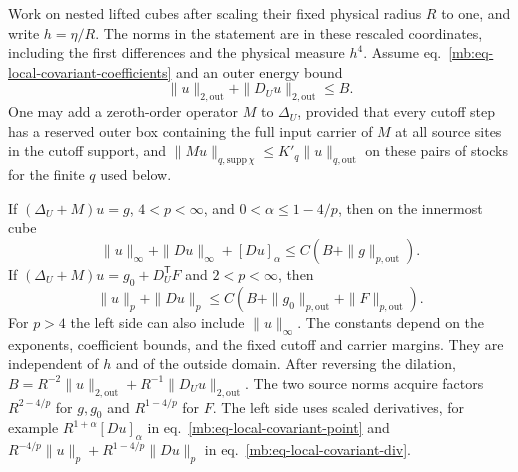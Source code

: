 \documentclass[11pt,letterpaper,reqno]{amsart}
\makeatletter
\numberwithin{equation}{section}
\renewcommand{\eqref}[1]{\textup{eq.~\ref{#1}}}
\theoremstyle{definition}
\newcommand{\ms@minorstart}{%
  \pushQED{\qed}\renewcommand{\qedsymbol}{$\blacksquare$}}
\newenvironment{proposition}[1][]{\ms@minorstart\ms@proposition[#1]}
  {\popQED\endms@proposition}
\theoremstyle{remark}
\makeatother
\begin{document}
\begin{proposition}[Local site bootstraps]\label{mb:prop-local-scalar}
Work on nested lifted cubes after scaling their fixed physical
radius \(R\) to one, and write \(h=\eta/R\). The norms in the
statement are in these rescaled coordinates, including the
first differences and the physical measure \(h^4\).
Assume \eqref{mb:eq-local-covariant-coefficients} and an
outer energy bound
\[
 \|u\|_{2,\mathrm{out}}+\|D_Uu\|_{2,\mathrm{out}}\le B .
\]
One may add a zeroth-order operator \(M\) to \(\Delta_U\),
provided that every cutoff step has a reserved outer box
containing the full input carrier of \(M\) at all source sites
in the cutoff support, and
\(\|Mu\|_{q,\mathrm{supp}\,\chi}\le K'_q\|u\|_{q,\mathrm{out}}\)
on these pairs of stocks for the finite \(q\) used below.

If \((\Delta_U+M)u=g\), \(4<p<\infty\), and
\(0<\alpha\le1-4/p\), then on the innermost cube
\begin{equation}\label{mb:eq-local-covariant-point}
 \|u\|_\infty+\|Du\|_\infty+[Du]_\alpha
                              \le C(B+\|g\|_{p,\mathrm{out}}).
\end{equation}
If \((\Delta_U+M)u=g_0+D_U^{\mathsf T}F\) and \(2<p<\infty\),
then
\begin{equation}\label{mb:eq-local-covariant-div}
 \|u\|_p+\|Du\|_p
                  \le C(B+\|g_0\|_{p,\mathrm{out}}
                                +\|F\|_{p,\mathrm{out}}).
\end{equation}
For \(p>4\) the left side can also include \(\|u\|_\infty\).
The constants depend on the exponents, coefficient bounds,
and the fixed cutoff and carrier margins. They are independent
of \(h\) and of the outside domain. After reversing the dilation,
\(B=R^{-2}\|u\|_{2,\mathrm{out}}
+R^{-1}\|D_Uu\|_{2,\mathrm{out}}\).
The two source norms acquire factors \(R^{2-4/p}\) for \(g,g_0\)
and \(R^{1-4/p}\) for \(F\). The left side uses scaled derivatives,
for example \(R^{1+\alpha}[Du]_\alpha\) in
\eqref{mb:eq-local-covariant-point} and
\(R^{-4/p}\|u\|_p+R^{1-4/p}\|Du\|_p\) in
\eqref{mb:eq-local-covariant-div}.
\end{proposition}
\end{document}
